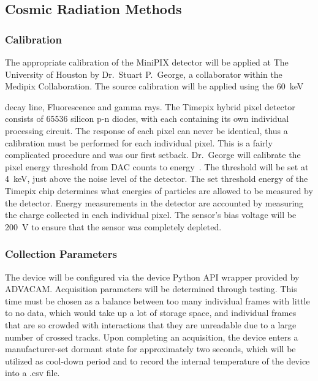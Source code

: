\subsection{Cosmic Radiation Methods}
\label{sec:RadiationMethods}

\subsubsection{Calibration}   
The appropriate calibration of the MiniPIX detector will be applied at The University of Houston by Dr.~Stuart P.~George, a collaborator within the Medipix Collaboration. The source calibration will be applied using the \SI{60}{\keV} { decay line,  Fluorescence and  gamma rays. The Timepix hybrid pixel detector consists of \num{65536} silicon p-n diodes, with each containing its own individual processing circuit. The response of each pixel can never be identical, thus a calibration must be performed for each individual pixel. This is a fairly complicated procedure and was our first setback. Dr.~George will calibrate the pixel energy threshold from DAC counts to energy~\cite{stuartthesis}. The threshold will be set at \SI{4}{\keV}, just above the noise level of the detector. The set threshold energy of the Timepix chip determines what energies of particles are allowed to be measured by the detector. Energy measurements in the detector are accounted by measuring the charge collected in each individual pixel. The sensor's bias voltage will be \SI{200}{\volt} to ensure that the sensor was completely depleted. 
  
\subsubsection{Collection Parameters}
The device will be configured via the device Python API wrapper provided by ADVACAM. Acquisition parameters will be determined through testing. This time must be chosen as a balance between too many individual frames with little to no data, which would take up a lot of storage space, and individual frames that are so crowded with interactions that they are unreadable due to a large number of crossed tracks. Upon completing an acquisition, the device enters a manufacturer-set dormant state for approximately two seconds, which will be utilized as cool-down period and to record the internal temperature of the device into a .csv file.

}
